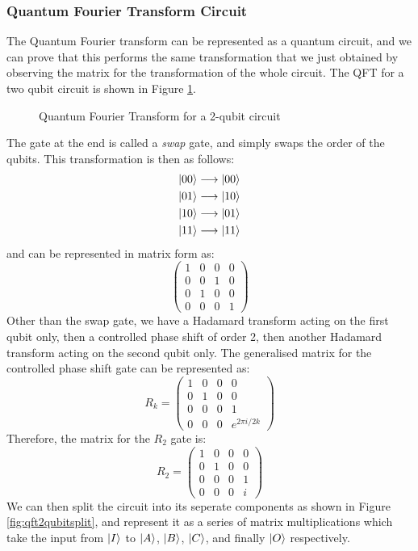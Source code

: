 \subsubsection{Quantum Fourier Transform Circuit}
The Quantum Fourier transform can be represented as a quantum circuit, and we can prove that this performs the same transformation that we just obtained by observing the matrix for the transformation of the whole circuit. The QFT for a two qubit circuit is shown in Figure \ref{fig:qft2qubit}.
\begin{figure}[!htb]
\centering
\resizebox{5cm}{!}{}
\caption{Quantum Fourier Transform for a 2-qubit circuit}
\label{fig:qft2qubit}
\end{figure}
The gate at the end is called a \emph{swap} gate, and simply swaps the order of the qubits. This transformation is then as follows:
\begin{align*}
    \ket{00} \longrightarrow \ket{00}\\
    \ket{01} \longrightarrow \ket{10}\\
    \ket{10} \longrightarrow \ket{01}\\
    \ket{11} \longrightarrow \ket{11}
\end{align*}
and can be represented in matrix form as:
$$
\begin{pmatrix}
1 & 0 & 0 & 0\\
0 & 0 & 1 & 0\\
0 & 1 & 0 & 0\\
0 & 0 & 0 & 1
\end{pmatrix}
$$
Other than the swap gate, we have a Hadamard transform acting on the first qubit only, then a controlled phase shift of order 2, then another Hadamard transform acting on the second qubit only. The generalised matrix for the controlled phase shift gate can be represented as:
$$
R_k = 
\begin{pmatrix}
1 & 0 & 0 & 0\\
0 & 1 & 0 & 0\\
0 & 0 & 0 & 1\\
0 & 0 & 0 &e^{2\pi i/2k}
\end{pmatrix}
$$
Therefore, the matrix for the $R_2$ gate is:
$$
R_2 = 
\begin{pmatrix}
1 & 0 & 0 & 0\\
0 & 1 & 0 & 0\\
0 & 0 & 0 & 1\\
0 & 0 & 0 & i
\end{pmatrix}
$$
We can then split the circuit into its seperate components as shown in Figure \ref{fig:qft2qubitsplit}, and represent it as a series of matrix multiplications which take the input from $\ket{I}$ to $\ket{A}$, $\ket{B}$, $\ket{C}$, and finally $\ket{O}$ respectively. 
